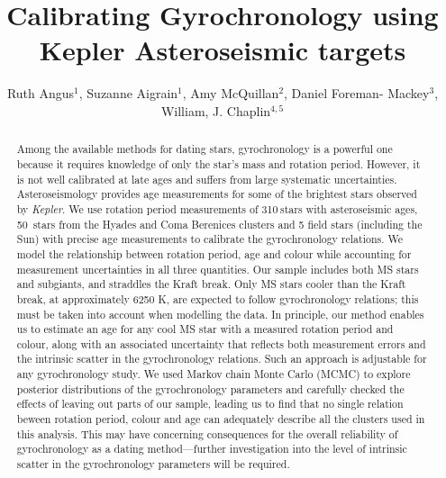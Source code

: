 \documentclass[11pt,preprint]{aastex}
\newcommand{\nastero}{310}
\newcommand{\nHC}{50~}
\begin{document}
\title{Calibrating Gyrochronology using Kepler Asteroseismic targets}

\author{Ruth Angus$^1$, Suzanne Aigrain$^1$, Amy McQuillan$^2$, Daniel Foreman-
Mackey$^3$,  William, J. Chaplin$^{4, 5}$}

\begin{abstract}
\label{abs}

Among the available methods for dating stars, gyrochronology is a powerful one
because it requires knowledge of only the star's mass and rotation period.
However, it is not well calibrated at late ages and suffers from large
systematic uncertainties.
Asteroseismology provides age measurements for some of the brightest stars
observed by {\it Kepler}.
We use rotation period measurements of \nastero$~$stars with asteroseismic
ages, \nHC stars from the Hyades and Coma Berenices clusters and 5 field stars
(including the Sun) with precise age measurements to calibrate the
gyrochronology relations.
We model the relationship between rotation period, age and colour while
accounting for measurement uncertainties in all three quantities.
Our sample includes both MS stars and subgiants, and straddles the Kraft break.
Only MS stars cooler than the Kraft break, at approximately 6250 K, are
expected to follow gyrochronology relations; this must be taken into account
when modelling the data.
In principle, our method enables us to estimate an age for any cool MS star
with a measured rotation period and colour, along with an associated
uncertainty that reflects both measurement errors and the intrinsic scatter in
the gyrochronology relations.
Such an approach is adjustable for any gyrochronology study.
We used Markov chain Monte Carlo (MCMC) to explore posterior distributions of
the gyrochronology parameters and carefully checked the effects of leaving out
parts of our sample, leading us to find that no single relation beween
rotation period, colour and age can adequately describe all the clusters used
in this analysis.
This may have concerning consequences for the overall reliability of
gyrochronology as a dating method---further investigation into the level of
intrinsic scatter in the gyrochronology parameters will be required.

\end{abstract}
\end{document}
